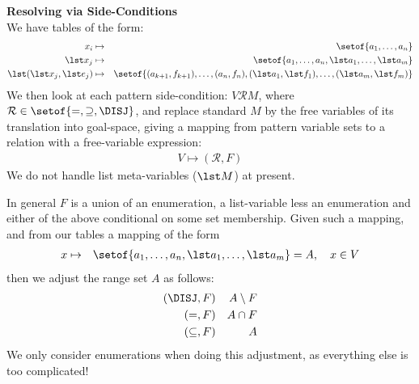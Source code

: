 \textbf{Resolving via Side-Conditions} \\
We have tables of the form:
\begin{eqnarray*}
  x_i &\mapsto& \setof{a_1,\ldots,a_n}
\\ \lst x_j &\mapsto& \setof{a_1,\ldots,a_n,\lst a_1,\ldots,\lst a_m}
\\ \lst (\lst x_j,\lst e_j) &\mapsto&
        \setof{(a_{k+1},f_{k+1}),\ldots,(a_n,f_n),
               (\lst a_1,\lst f_1),\ldots,(\lst a_m,\lst f_m)}
\end{eqnarray*}
We then look at each pattern side-condition: $V \mathcal R M$,
where $\mathcal R \in \setof{=,\supseteq,\DISJ}$,
and replace standard $M$ by the free variables of its translation into goal-space,
giving a mapping from pattern variable sets
to a relation with a free-variable expression:
\begin{eqnarray*}
  V \mapsto (\mathcal R,F)
\end{eqnarray*}
We do not handle list meta-variables ($\lst M$) at present.

In general $F$ is a union of an enumeration, a list-variable less an enumeration
and either of the above conditional on some set membership.
Given such a mapping,
and from our tables a mapping of the form
\begin{eqnarray*}
 x  &\mapsto& \setof{a_1,\ldots,a_n,\lst a_1,\ldots,\lst a_m} = A, \quad x \in V
\end{eqnarray*}
then we adjust the range set $A$ as follows:
\begin{eqnarray*}
   (\DISJ,F)     && A \setminus F
\\ (=,F)         && A \cap F
\\ (\subseteq,F) && A
\end{eqnarray*}
We only consider enumerations when doing this adjustment,
as everything else is too complicated!
